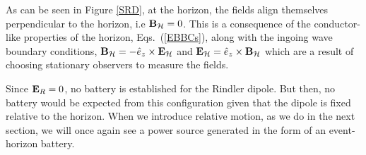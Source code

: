 As can be seen in Figure \ref{SRD}, at the horizon, the fields align themselves
perpendicular to the horizon, i.e ${\bf B}_{\mathcal{H}}=0$. This is a consequence of
the conductor-like properties of the horizon, Eqs.\ (\ref{EBBCs}),
along with the ingoing wave boundary conditions, ${\bf B}_{\mathcal{H}} = -\hat{e}_z
\times {\bf E}_{\mathcal{H}}$ and ${\bf E}_{\mathcal{H}} = \hat{e}_z
\times {\bf B}_{\mathcal{H}}$ which are a result of
choosing stationary observers to measure the fields.

Since ${\bf E}_R=0$, no battery is established for the Rindler dipole. But then, no
battery would be expected from this configuration given that the dipole is
fixed relative to the horizon. When we introduce relative motion, as
we do in the next section, we will once again see a power source
generated in the form of an event-horizon battery.



